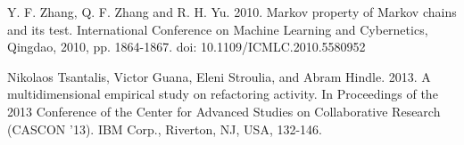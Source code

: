 \documentclass[conference]{IEEEtran}
\begin{document}
\begin{thebibliography}{}
Y. F. Zhang, Q. F. Zhang and R. H. Yu. 2010. Markov property of Markov chains and its test. International Conference on Machine Learning and Cybernetics, Qingdao, 2010, pp. 1864-1867. doi: 10.1109/ICMLC.2010.5580952

Nikolaos Tsantalis, Victor Guana, Eleni Stroulia, and Abram Hindle. 2013. A multidimensional empirical study on refactoring activity. In Proceedings of the 2013 Conference of the Center for Advanced Studies on Collaborative Research (CASCON '13). IBM Corp., Riverton, NJ, USA, 132-146. 

\end{thebibliography}




\end{document}
